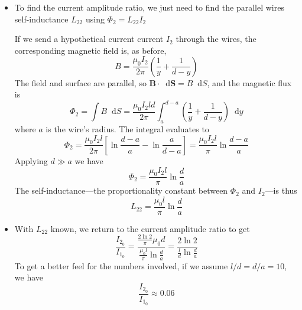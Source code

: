 \documentclass[11pt, a4paper]{article}
\newcommand{\diff}{\mathop{}\!\mathrm{d}} %
\renewcommand{\vec}[1]{\bm{#1}} %
\newcommand{\mm}{\mu_{0}}  %
\newcommand{\m}{\vec{m}}  %
\begin{document}
\begin{itemize}
	\item To find the current amplitude ratio, we just need to find the parallel wires self-inductance $ L_{22} $ using $ \Phi_{2} = L_{22}I_{2} $
	
	If we send a hypothetical current current $ I_{2} $ through the wires, the corresponding magnetic field is, as before,
	\begin{equation*}
		B = \frac{\mm I_{2}}{2\pi} \left(\frac{1}{y} + \frac{1}{d-y}\right) 
	\end{equation*}
	The field and surface are parallel, so $ \vec{B} \cdot \diff \vec{S} = B \diff S $, and the magnetic flux is
	\begin{equation*}
		\Phi_{2} = \int B \diff S = \frac{\mm I_{2} l d}{2 \pi}\int_{a}^{d-a}\left(\frac{1}{y} + \frac{1}{d-y}\right)\diff y
	\end{equation*}
	where $ a $ is the wire's radius. The integral evaluates to
	\begin{equation*}
		\Phi_{2} = \frac{\mm I_{2} l}{2 \pi}\left[\ln \frac{d-a}{a} - \ln \frac{a}{d-a}\right] = \frac{\mm I_{2} l}{\pi} \ln \frac{d-a}{a}
	\end{equation*}
	Applying $ d \gg a $ we have
	\begin{equation*}
		\Phi_{2} = \frac{\mm I_{2} l}{\pi} \ln \frac{d}{a}
	\end{equation*}
	The self-inductance---the proportionality constant between $ \Phi_{2} $ and $ I_{2} $---is thus
	\begin{equation*}
		L_{22} = \frac{\mm l}{\pi}\ln \frac{d}{a}
	\end{equation*}
	
	\item With $ L_{22} $ known, we return to the current amplitude ratio to get
	\begin{equation*}
		\frac{I_{2_{0}}}{I_{1_{0}}} = \frac{\frac{2\ln 2}{\pi} \mm d}{\frac{\mm l}{\pi}\ln \frac{d}{a}} = \frac{2\ln 2}{\frac{l}{d} \ln \frac{d}{a}}
	\end{equation*}
	To get a better feel for the numbers involved, if we assume $ l/d = d/a = 10 $, we have 
	\begin{equation*}
		\frac{I_{2_{0}}}{I_{1_{0}}} \approx 0.06
	\end{equation*}
\end{itemize}
\end{document}
